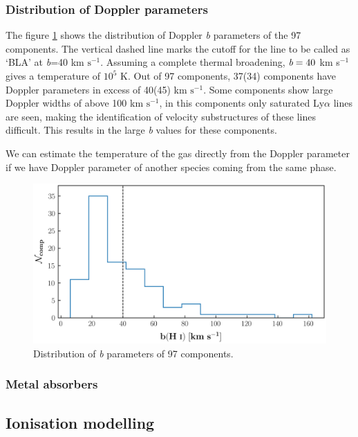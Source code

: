\subsubsection*{Distribution of Doppler parameters}

The figure \ref{fig:b_HI_distribution} shows the distribution of Doppler \emph{b} parameters of the 97  components. The vertical dashed line marks the cutoff for the line to be called as `BLA' at \emph{b}=40 km $\text{s}^{-1}$. Assuming a complete thermal broadening, $\emph{b}=40$ km s$^{-1}$ gives a temperature of $10^5$ K. Out of 97 components, 37(34) components have Doppler parameters in excess of 40(45) km $\text{s}^{-1}$. Some components show large Doppler widths of above 100 km $\text{s}^{-1}$, in this components only saturated Ly$\alpha$ lines are seen, making the identification of velocity substructures of these lines difficult. This results in the large \emph{b} values for these components. 

We can estimate the temperature of the gas directly from the Doppler parameter if we have Doppler parameter of another species coming from the same phase. 

\begin{figure}
    \centering
    \includegraphics[width=\linewidth]{Figures/b_HI_distribution_survey.png}
    \caption{Distribution of \emph{b} parameters of 97  components.}
    \label{fig:b_HI_distribution} 
\end{figure}


\subsubsection{Metal absorbers}



\subsection{Ionisation modelling}





